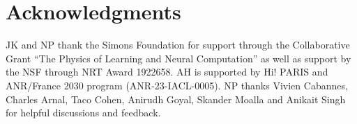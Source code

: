 


\section*{Acknowledgments}
JK and NP thank the Simons Foundation for support through the Collaborative Grant “The Physics of Learning and Neural Computation” as well as support by the NSF through NRT Award 1922658. AH is supported by Hi! PARIS and ANR/France 2030 program (ANR-23-IACL-0005). NP thanks Vivien Cabannes, Charles Arnal, Taco Cohen, Anirudh Goyal, Skander Moalla and Anikait Singh for helpful discussions and feedback. 
